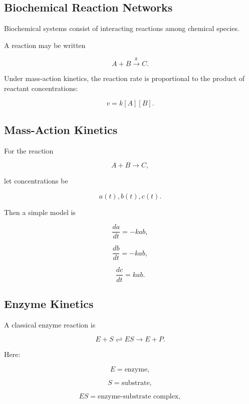 \subsection{Biochemical Reaction Networks}
\label{subsec:biochemical-reaction-networks}

Biochemical systems consist of interacting reactions among chemical
species.

A reaction may be written

\[
\boxed{
A+B
\xrightarrow{k}
C.
}
\]

Under mass-action kinetics, the reaction rate is proportional to the product
of reactant concentrations:

\[
\boxed{
v=k[A][B].
}
\]

\subsection{Mass-Action Kinetics}
\label{subsec:mass-action-kinetics}

For the reaction

\[
A+B
\rightarrow
C,
\]

let concentrations be

\[
a(t),b(t),c(t).
\]

Then a simple model is

\[
\boxed{
\frac{da}{dt}
=
-kab,
}
\]

\[
\boxed{
\frac{db}{dt}
=
-kab,
}
\]

\[
\boxed{
\frac{dc}{dt}
=
kab.
}
\]

\subsection{Enzyme Kinetics}
\label{subsec:enzyme-kinetics}

A classical enzyme reaction is

\[
\boxed{
E+S
\rightleftharpoons
ES
\rightarrow
E+P.
}
\]

Here:

\[
E
=
\text{enzyme},
\]

\[
S
=
\text{substrate},
\]

\[
ES
=
\text{enzyme-substrate complex},
\]

